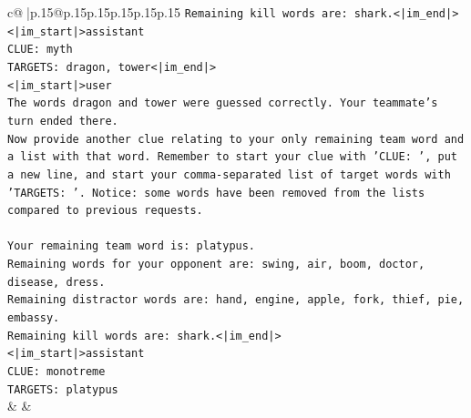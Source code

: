 \documentclass{article}
\begin{document}
{\begin{supertabular}{c@{$\;$}|p{.15\linewidth}@{}p{.15\linewidth}p{.15\linewidth}p{.15\linewidth}p{.15\linewidth}p{.15\linewidth}}
{{{\texttt{Remaining kill words are: shark.<|im\_end|>} \\
\texttt{<|im\_start|>assistant} \\
\texttt{CLUE: myth} \\
\texttt{TARGETS: dragon, tower<|im\_end|>} \\
\texttt{<|im\_start|>user} \\
\texttt{The words dragon and tower were guessed correctly. Your teammate's turn ended there.} \\
\texttt{Now provide another clue relating to your only remaining team word and a list with that word. Remember to start your clue with 'CLUE: ', put a new line, and start your comma{-}separated list of target words with 'TARGETS: '. Notice: some words have been removed from the lists compared to previous requests.} \\
\\ 
\texttt{Your remaining team word is: platypus.} \\
\texttt{Remaining words for your opponent are: swing, air, boom, doctor, disease, dress.} \\
\texttt{Remaining distractor words are: hand, engine, apple, fork, thief, pie, embassy.} \\
\texttt{Remaining kill words are: shark.<|im\_end|>} \\
\texttt{<|im\_start|>assistant} \\
\texttt{CLUE: monotreme} \\
\texttt{TARGETS: platypus} \\
            }
        }
    }
    & & \\ \\


\end{supertabular}}
\end{document}
